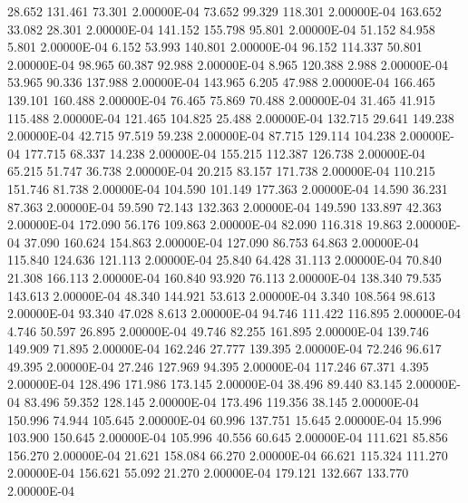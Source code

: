     28.652   131.461    73.301  2.00000E-04
    73.652    99.329   118.301  2.00000E-04
   163.652    33.082    28.301  2.00000E-04
   141.152   155.798    95.801  2.00000E-04
    51.152    84.958     5.801  2.00000E-04
     6.152    53.993   140.801  2.00000E-04
    96.152   114.337    50.801  2.00000E-04
    98.965    60.387    92.988  2.00000E-04
     8.965   120.388     2.988  2.00000E-04
    53.965    90.336   137.988  2.00000E-04
   143.965     6.205    47.988  2.00000E-04
   166.465   139.101   160.488  2.00000E-04
    76.465    75.869    70.488  2.00000E-04
    31.465    41.915   115.488  2.00000E-04
   121.465   104.825    25.488  2.00000E-04
   132.715    29.641   149.238  2.00000E-04
    42.715    97.519    59.238  2.00000E-04
    87.715   129.114   104.238  2.00000E-04
   177.715    68.337    14.238  2.00000E-04
   155.215   112.387   126.738  2.00000E-04
    65.215    51.747    36.738  2.00000E-04
    20.215    83.157   171.738  2.00000E-04
   110.215   151.746    81.738  2.00000E-04
   104.590   101.149   177.363  2.00000E-04
    14.590    36.231    87.363  2.00000E-04
    59.590    72.143   132.363  2.00000E-04
   149.590   133.897    42.363  2.00000E-04
   172.090    56.176   109.863  2.00000E-04
    82.090   116.318    19.863  2.00000E-04
    37.090   160.624   154.863  2.00000E-04
   127.090    86.753    64.863  2.00000E-04
   115.840   124.636   121.113  2.00000E-04
    25.840    64.428    31.113  2.00000E-04
    70.840    21.308   166.113  2.00000E-04
   160.840    93.920    76.113  2.00000E-04
   138.340    79.535   143.613  2.00000E-04
    48.340   144.921    53.613  2.00000E-04
     3.340   108.564    98.613  2.00000E-04
    93.340    47.028     8.613  2.00000E-04
    94.746   111.422   116.895  2.00000E-04
     4.746    50.597    26.895  2.00000E-04
    49.746    82.255   161.895  2.00000E-04
   139.746   149.909    71.895  2.00000E-04
   162.246    27.777   139.395  2.00000E-04
    72.246    96.617    49.395  2.00000E-04
    27.246   127.969    94.395  2.00000E-04
   117.246    67.371     4.395  2.00000E-04
   128.496   171.986   173.145  2.00000E-04
    38.496    89.440    83.145  2.00000E-04
    83.496    59.352   128.145  2.00000E-04
   173.496   119.356    38.145  2.00000E-04
   150.996    74.944   105.645  2.00000E-04
    60.996   137.751    15.645  2.00000E-04
    15.996   103.900   150.645  2.00000E-04
   105.996    40.556    60.645  2.00000E-04
   111.621    85.856   156.270  2.00000E-04
    21.621   158.084    66.270  2.00000E-04
    66.621   115.324   111.270  2.00000E-04
   156.621    55.092    21.270  2.00000E-04
   179.121   132.667   133.770  2.00000E-04
